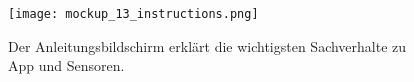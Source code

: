 	\newpage
	\begin{figure}[ht!]
		\begin{center}
			\texttt{[image: mockup\_13\_instructions.png]}
		\end{center}
		\caption[Mockup Anleitungsbildschirm]{Der Anleitungsbildschirm erklärt die wichtigsten Sachverhalte zu App und Sensoren.}
		\label{fig:mockup_13}
	\end{figure}	

